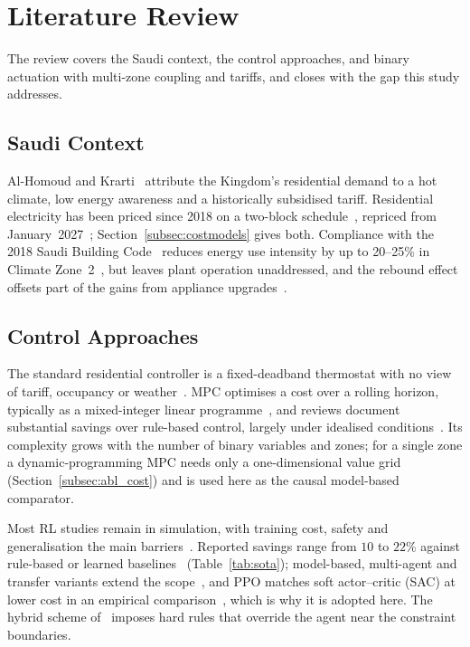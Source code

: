 \documentclass[3p,twocolumn,number]{elsarticle}
\begin{document}
\section{Literature Review}
\label{sec:litreview}

The review covers the Saudi context, the control approaches, and binary actuation with multi-zone coupling and tariffs, and closes with the gap this study addresses.

\subsection{Saudi Context}

Al-Homoud and Krarti~\cite{AlHomoud2021} attribute the Kingdom's residential demand to a hot climate, low energy awareness and a historically subsidised tariff. Residential electricity has been priced since 2018 on a two-block schedule~\cite{SEC2024}, repriced from January~2027~\cite{SaudiEnergy2027}; Section~\ref{subsec:costmodels} gives both. Compliance with the 2018 Saudi Building Code~\cite{Alayed2021} reduces energy use intensity by up to 20--25\% in Climate Zone~2~\cite{Olawale2025}, but leaves plant operation unaddressed, and the rebound effect offsets part of the gains from appliance upgrades~\cite{Belaid2024}.

\subsection{Control Approaches}

The standard residential controller is a fixed-deadband thermostat with no view of tariff, occupancy or weather~\cite{Alotaibi2024}. MPC optimises a cost over a rolling horizon, typically as a mixed-integer linear programme~\cite{Risbeck2017,Dinh2022}, and reviews document substantial savings over rule-based control, largely under idealised conditions~\cite{Drgona2020}. Its complexity grows with the number of binary variables and zones; for a single zone a dynamic-programming MPC needs only a one-dimensional value grid (Section~\ref{subsec:abl_cost}) and is used here as the causal model-based comparator.

Most RL studies remain in simulation, with training cost, safety and generalisation the main barriers~\cite{WangHong2020}. Reported savings range from $10$ to $22\%$ against rule-based or learned baselines~\cite{Azuatalam2020,Biemann2021,Du2021b,Du2021a} (Table~\ref{tab:sota}); model-based, multi-agent and transfer variants extend the scope~\cite{Ding2024,Liu2024,Hou2024}, and PPO matches soft actor--critic (SAC) at lower cost in an empirical comparison~\cite{Manjavacas2024}, which is why it is adopted here. The hybrid scheme of~\cite{Xu2025} imposes hard rules that override the agent near the constraint boundaries.
\end{document}
